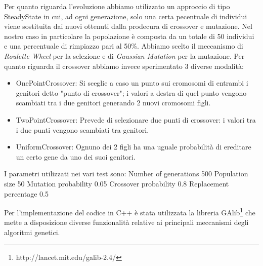 \documentclass[]{report}
\begin{document}
Per quanto riguarda l'evoluzione abbiamo utilizzato un approccio di tipo SteadyState in cui, ad ogni generazione, solo una certa pecentuale di individui viene sostituita dai nuovi ottenuti dalla prodecura di crossover e mutazione. Nel nostro caso in particolare la popolazione è composta da un totale di 50 individui e una percentuale di rimpiazzo pari al 50\%.  Abbiamo scelto il meccanismo di \textit{Roulette Wheel} per la selezione e di \textit{Gaussian Mutation} per la mutazione.
Per quanto riguarda il crossover abbiamo invece sperimentato 3 diverse modalità: 
\begin{itemize}
\item{OnePointCrossover}: Si sceglie a caso un punto sui cromosomi di entrambi i genitori detto "punto di crossover"; i valori a destra di quel punto vengono scambiati tra i due genitori generando 2 nuovi cromosomi figli.
\item{TwoPointCrossover}: Prevede di selezionare due punti di crossover: i valori tra i due punti vengono scambiati tra genitori.
\item{UniformCrossover}: Ognuno dei 2 figli ha una uguale probabilità di ereditare un certo gene da uno dei suoi genitori.
 \end{itemize}

I parametri utilizzati nei vari test sono:
Number of generations 500
Population size 50
Mutation probability 0.05
Crossover probability 0.8
Replacement percentage 0.5

Per l'implementazione del codice in C++ è stata utilizzata la libreria GAlib\footnote{http://lancet.mit.edu/galib-2.4/} che mette a disposizione diverse funzionalità relative ai principali meccanismi degli algoritmi genetici.






\end{document}
